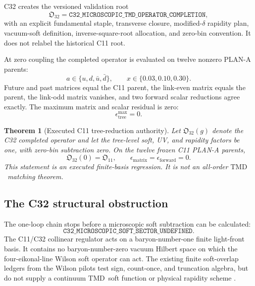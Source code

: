 \documentclass[11pt]{article}
\newtheorem{theorem}[definition]{Theorem}
\newcommand{\TMD}{\ensuremath{\mathrm{TMD}}}
\begin{document}
C32 creates the versioned validation root
\begin{equation}
 \mathfrak O_{32}
 =
 \texttt{C32\_MICROSCOPIC\_TMD\_OPERATOR\_COMPLETION},
 \label{eq:c32-root}
\end{equation}
with an explicit fundamental staple, transverse closure, modified-\(\delta\) rapidity plan, vacuum-soft definition, inverse-square-root allocation, and zero-bin convention.  It does not relabel the historical C11 root.

At zero coupling the completed operator is evaluated on twelve nonzero PLAN-A parents:
\begin{equation}
 a\in\{u,d,\bar u,\bar d\},
 \qquad
 x\in\{0.03,0.10,0.30\}.
 \label{eq:twelve-parents}
\end{equation}
Future and past matrices equal the C11 parent, the link-even matrix equals the parent, the link-odd matrix vanishes, and two forward scalar reductions agree exactly.  The maximum matrix and scalar residual is zero:
\begin{equation}
 \epsilon_{\mathrm{tree}}^{\max}=0.
 \label{eq:tree-residual}
\end{equation}

\begin{theorem}[Executed C11 tree-reduction authority]
\label{thm:c11-tree}
Let \(\mathfrak O_{32}(g)\) denote the C32 completed operator and let the tree-level soft, UV, and rapidity factors be one, with zero-bin subtraction zero.  On the twelve frozen C11 PLAN-A parents,
\begin{equation}
 \mathfrak O_{32}(0)
 =
 \mathfrak O_{11},
 \qquad
 \epsilon_{\mathrm{matrix}}
 =
 \epsilon_{\mathrm{forward}}
 =
 0.
 \label{eq:c11-tree-reduction}
\end{equation}
This statement is an executed finite-basis regression.  It is not an all-order \TMD\ matching theorem.
\end{theorem}

\subsection{The C32 structural obstruction}

The one-loop chain stops before a microscopic soft subtraction can be calculated:
\begin{equation}
 \boxed{\texttt{C32\_MICROSCOPIC\_SOFT\_SECTOR\_UNDEFINED}}.
 \label{eq:c32-soft-obstruction}
\end{equation}
The C11/C32 collinear regulator acts on a baryon-number-one finite light-front basis.  It contains no baryon-number-zero vacuum Hilbert space on which the four-eikonal-line Wilson soft operator can act.  The existing finite soft-overlap ledgers from the Wilson pilots test sign, count-once, and truncation algebra, but do not supply a continuum \TMD\ soft function or physical rapidity scheme \cite{C12Report,C14Report}.
\end{document}
